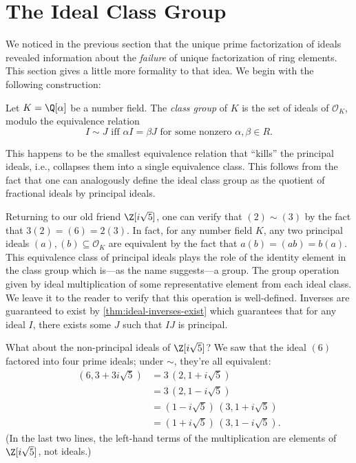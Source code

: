 \section{The Ideal Class Group}

We noticed in the previous section that the unique prime factorization of ideals revealed information about the \emph{failure} of unique factorization of ring elements. This section gives a little more formality to that idea. We begin with the following construction:

\begin{definition}
    \label{def:ideal-class-group}
    Let $K = \Q[\alpha]$ be a number field. The \textit{class group} of $K$ is the set of ideals of $\mathcal O_K$, modulo the equivalence relation
    \begin{equation}
        I \sim J \text{ iff } \alpha I = \beta J \text{ for some nonzero } \alpha, \beta \in R.
    \end{equation}
\end{definition}

This happens to be the smallest equivalence relation that ``kills'' the principal ideals, i.e., collapses them into a single equivalence class.
This follows from the fact that one can analogously define the ideal class group as the quotient of fractional ideals by principal ideals.

Returning to our old friend $\Z[i \sqrt 5]$, one can verify that $(2) \sim (3)$ by the fact that $3 (2) = (6) = 2 (3)$.
In fact, for any number field $K$, any two principal ideals $(a), (b) \subseteq \mathcal O_K$ are equivalent by the fact that $a (b) = (ab) = b (a)$.
This equivalence class of principal ideals plays the role of the identity element in the class group which is---as the name suggests---a group. The group operation given by ideal multiplication of some representative element from each ideal class. We leave it to the reader to verify that this operation is well-defined. Inverses are guaranteed to exist by \autoref{thm:ideal-inverses-exist} which guarantees that for any ideal $I$, there exists some $J$ such that $IJ$ is principal.

What about the non-principal ideals of $\Z[i \sqrt 5]$? We saw that the ideal $(6)$ factored into four prime ideals; under $\sim$, they're all equivalent:
\begin{equation}
    \begin{aligned}
        (6, 3 + 3 i \sqrt 5)
         & = 3 \, (2, 1 + i \sqrt 5)                \\
         & = 3 \, (2, 1 - i \sqrt 5)                \\
         & = (1 - i \sqrt 5) \, (3, 1 + i \sqrt 5)  \\
         & = (1 + i \sqrt 5) \, (3, 1 - i \sqrt 5).
    \end{aligned}
\end{equation}
(In the last two lines, the left-hand terms of the multiplication are elements of $\Z[i \sqrt 5]$, not ideals.)

